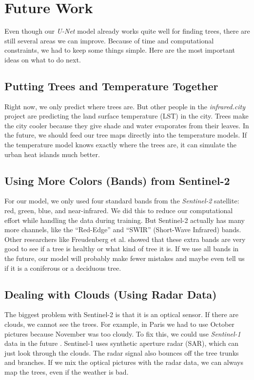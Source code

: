 \section{Future Work}

Even though our \textit{U-Net} model already works quite well for finding trees, there are still several areas we can improve. Because of time and computational constraints, we had to keep some things simple. Here are the most important ideas on what to do next.

\subsection{Putting Trees and Temperature Together}

Right now, we only predict where trees are. But other people in the \textit{infrared.city} project are predicting the land surface temperature (LST) in the city. Trees make the city cooler because they give shade and water evaporates from their leaves. In the future, we should feed our tree maps directly into the temperature models. If the temperature model knows exactly where the trees are, it can simulate the urban heat islands much better. 

\subsection{Using More Colors (Bands) from Sentinel-2}

For our model, we only used four standard bands from the \textit{Sentinel-2} satellite: red, green, blue, and near-infrared. We did this to reduce our computational effort while handling the data during training. But Sentinel-2 actually has many more channels, like the ``Red-Edge'' and ``SWIR'' (Short-Wave Infrared) bands. Other researchers like Freudenberg et al. \cite{freudenberg2025sentinel2} showed that these extra bands are very good to see if a tree is healthy or what kind of tree it is. If we use all bands in the future, our model will probably make fewer mistakes and maybe even tell us if it is a coniferous or a deciduous tree.

\subsection{Dealing with Clouds (Using Radar Data)}

The biggest problem with Sentinel-2 is that it is an optical sensor. If there are clouds, we cannot see the trees. For example, in Paris we had to use October pictures because November was too cloudy. To fix this, we could use \textit{Sentinel-1} data in the future \cite{torres2012sentinel}. Sentinel-1 uses synthetic aperture radar (SAR), which can just look through the clouds. The radar signal also bounces off the tree trunks and branches. If we mix the optical pictures with the radar data, we can always map the trees, even if the weather is bad.

